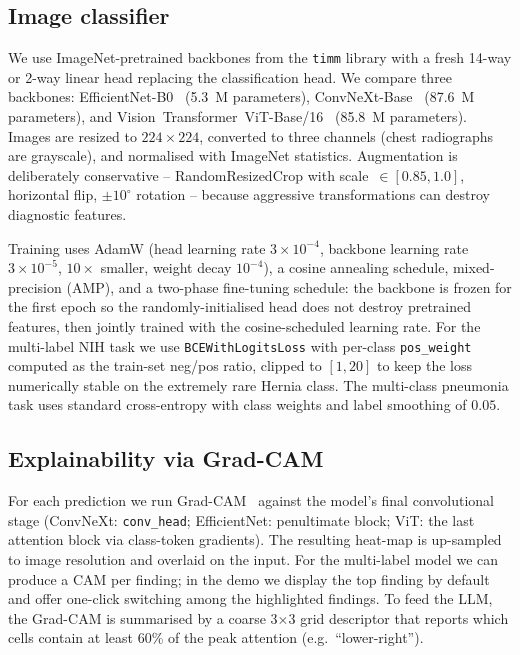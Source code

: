 \documentclass[10pt,journal,onecolumn]{IEEEtran}
\begin{document}
\subsection{Image classifier}
We use ImageNet-pretrained backbones from the \texttt{timm} library with a fresh 14-way or 2-way linear head replacing the classification head. We compare three backbones: EfficientNet-B0~\cite{tan2019efficientnet} (5.3~M parameters), ConvNeXt-Base~\cite{liu2022convnext} (87.6~M parameters), and Vision~Transformer~ViT-Base/16~\cite{dosovitskiy2020vit} (85.8~M parameters). Images are resized to $224\times224$, converted to three channels (chest radiographs are grayscale), and normalised with ImageNet statistics. Augmentation is deliberately conservative -- RandomResizedCrop with scale~$\in[0.85, 1.0]$, horizontal flip, $\pm10^\circ$ rotation -- because aggressive transformations can destroy diagnostic features.

Training uses AdamW (head learning rate $3\times10^{-4}$, backbone learning rate $3\times10^{-5}$, $10\times$ smaller, weight decay $10^{-4}$), a cosine annealing schedule, mixed-precision (AMP), and a two-phase fine-tuning schedule: the backbone is frozen for the first epoch so the randomly-initialised head does not destroy pretrained features, then jointly trained with the cosine-scheduled learning rate. For the multi-label NIH task we use \texttt{BCEWithLogitsLoss} with per-class \texttt{pos\_weight} computed as the train-set neg/pos ratio, clipped to $[1, 20]$ to keep the loss numerically stable on the extremely rare Hernia class. The multi-class pneumonia task uses standard cross-entropy with class weights and label smoothing of $0.05$.

\subsection{Explainability via Grad-CAM}
For each prediction we run Grad-CAM~\cite{selvaraju2017gradcam} against the model's final convolutional stage (ConvNeXt: \texttt{conv\_head}; EfficientNet: penultimate block; ViT: the last attention block via class-token gradients). The resulting heat-map is up-sampled to image resolution and overlaid on the input. For the multi-label model we can produce a CAM per finding; in the demo we display the top finding by default and offer one-click switching among the highlighted findings. To feed the LLM, the Grad-CAM is summarised by a coarse 3$\times$3 grid descriptor that reports which cells contain at least 60\% of the peak attention (e.g.\ ``lower-right'').
\end{document}
